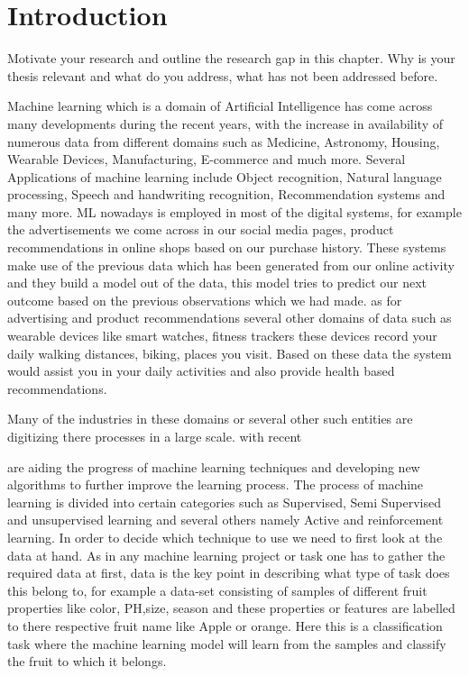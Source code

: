 \chapter{Introduction}\label{chap:introduction}


Motivate your research and outline the research gap in this chapter. Why is your thesis relevant and what do you address, what has not been addressed before. 


Machine learning which is a domain of Artificial Intelligence has come across many developments during the recent years, with the increase in availability of numerous data from different domains such as Medicine, Astronomy, Housing, Wearable Devices, Manufacturing, E-commerce and much more. Several Applications of machine learning include Object recognition, Natural language processing, Speech and handwriting recognition, Recommendation systems and many more. ML nowadays is employed in most of the digital systems, for example the advertisements we come across in our social media pages, product recommendations in online shops based on our purchase history. These systems make use of the previous data which has been generated from our online activity and they build a model out of the data, this model tries to predict our next outcome based on the previous observations which we had made. as for advertising and product recommendations several other domains of data such as wearable devices like smart watches, fitness trackers these devices record your daily walking distances, biking, places you visit. Based on these data the system would assist you in your daily activities and also provide health based recommendations.


Many of the industries in these domains or several other such entities are digitizing there processes in a large scale. with recent 


are aiding the progress of machine learning techniques and developing new algorithms to further improve the learning process. The process of machine learning is divided into certain categories such as Supervised, Semi Supervised and unsupervised learning and several others namely Active and reinforcement learning. In order to decide which technique to use we need to first look at the data at hand. As in any machine learning project or task one has to gather the required data at first, data is the key point in describing what type of task does this belong to, for example a data-set consisting of samples of different fruit properties like color, PH,size, season and these properties or features are labelled to there respective fruit name like Apple or orange. Here this is a classification task where the machine learning model will learn from the samples and classify the fruit to which it belongs.  

